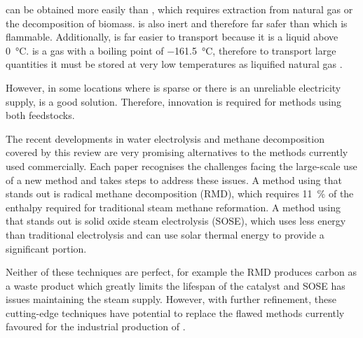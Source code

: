   can be obtained more easily than  , which requires extraction from natural gas or the decomposition of biomass.
  is also inert and therefore far safer than   which is flammable.
Additionally,   is far easier to transport because it is a liquid above \SI{0}{\celsius}.
 is a gas with a boiling point of \SI{-161.5}{\celsius}\cite{Lemmon2017}, therefore to transport large quantities it must be stored at very low temperatures as liquified natural gas \cite{lngamerica}.

However, in some locations where   is sparse or there is an unreliable electricity supply,   is a good solution\cite{SBN2020}.
Therefore, innovation is required for methods using both feedstocks.

The recent developments in water electrolysis and methane decomposition covered by this review are very promising alternatives to the methods currently used commercially.
Each paper recognises the challenges facing the large-scale use of a new method and takes steps to address these issues.
A method using   that stands out is radical methane decomposition (RMD), which requires \SI{11}{\percent} of the enthalpy required for traditional steam methane reformation.
A method using   that stands out is solid oxide steam electrolysis (SOSE), which uses less energy than traditional electrolysis and can use solar thermal energy to provide a significant portion.

Neither of these techniques are perfect, for example the RMD produces carbon as a waste product which greatly limits the lifespan of the catalyst and SOSE has issues maintaining the steam supply.
However, with further refinement, these cutting-edge techniques have potential to replace the flawed methods currently favoured for the industrial production of  .
